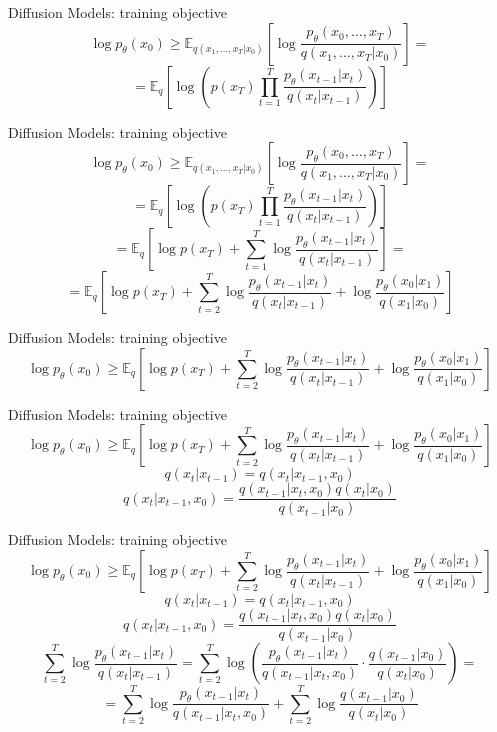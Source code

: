\documentclass{beamer}
\begin{document}
\begin{frame}[t]{Diffusion Models: training objective \cite{sohldickstein2015deep}}
    $$ \log p_\theta(x_0) \geq \mathbb{E}_{q(x_1, \dots, x_T|x_0)} \left[ \log \frac{p_\theta(x_0, \dots, x_T)}{q(x_1, \dots, x_T|x_0)} \right] = $$
    $$ = \mathbb{E}_q \left[ \log \left( p(x_T) \prod_{t=1}^T \frac{p_\theta(x_{t-1}|x_t)}{q(x_t|x_{t-1})} \right) \right] $$
\end{frame}

\begin{frame}[t]{Diffusion Models: training objective \cite{sohldickstein2015deep}}
    $$ \log p_\theta(x_0) \geq \mathbb{E}_{q(x_1, \dots, x_T|x_0)} \left[ \log \frac{p_\theta(x_0, \dots, x_T)}{q(x_1, \dots, x_T|x_0)} \right] = $$
    $$ = \mathbb{E}_q \left[ \log \left( p(x_T) \prod_{t=1}^T \frac{p_\theta(x_{t-1}|x_t)}{q(x_t|x_{t-1})} \right) \right] $$
    $$ = \mathbb{E}_q \left[ \log p(x_T) + \sum_{t=1}^T \log \frac{p_\theta(x_{t-1}|x_t)}{q(x_t|x_{t-1})} \right] = $$
    $$ = \mathbb{E}_q \left[ \log p(x_T) + \sum_{t=2}^T \log \frac{p_\theta(x_{t-1}|x_t)}{q(x_t|x_{t-1})} + \log \frac{p_\theta(x_0|x_1)}{q(x_1|x_0)} \right] $$
\end{frame}

\begin{frame}[t]{Diffusion Models: training objective \cite{sohldickstein2015deep}}
    $$ \log p_\theta(x_0) \geq \mathbb{E}_q \left[ \log p(x_T) + \sum_{t=2}^T \log \frac{p_\theta(x_{t-1}|x_t)}{q(x_t|x_{t-1})} + \log \frac{p_\theta(x_0|x_1)}{q(x_1|x_0)} \right] $$
\end{frame}

\begin{frame}[t]{Diffusion Models: training objective \cite{sohldickstein2015deep}}
    $$ \log p_\theta(x_0) \geq \mathbb{E}_q \left[ \log p(x_T) + \sum_{t=2}^T \log \frac{p_\theta(x_{t-1}|x_t)}{q(x_t|x_{t-1})} + \log \frac{p_\theta(x_0|x_1)}{q(x_1|x_0)} \right] $$
    $$ q(x_t|x_{t-1}) = q(x_t|x_{t-1}, x_0) $$
    $$ q(x_t|x_{t-1}, x_0) = \frac{q(x_{t-1}|x_t, x_0) q(x_t|x_0)}{q(x_{t-1}|x_0)} $$
\end{frame}

\begin{frame}[t]{Diffusion Models: training objective \cite{sohldickstein2015deep}}
    $$ \log p_\theta(x_0) \geq \mathbb{E}_q \left[ \log p(x_T) + \sum_{t=2}^T \log \frac{p_\theta(x_{t-1}|x_t)}{q(x_t|x_{t-1})} + \log \frac{p_\theta(x_0|x_1)}{q(x_1|x_0)} \right] $$
    $$ q(x_t|x_{t-1}) = q(x_t|x_{t-1}, x_0) $$
    $$ q(x_t|x_{t-1}, x_0) = \frac{q(x_{t-1}|x_t, x_0) q(x_t|x_0)}{q(x_{t-1}|x_0)} $$
    $$ \sum_{t=2}^T \log \frac{p_\theta(x_{t-1}|x_t)}{q(x_t|x_{t-1})} = \sum_{t=2}^T \log \left( \frac{p_\theta(x_{t-1}|x_t)}{q(x_{t-1}|x_t, x_0)} \cdot \frac{q(x_{t-1}|x_0)}{q(x_t|x_0)} \right) = $$
    $$ = \sum_{t=2}^T \log \frac{p_\theta(x_{t-1}|x_t)}{q(x_{t-1}|x_t, x_0)} + \sum_{t=2}^T \log \frac{q(x_{t-1}|x_0)}{q(x_t|x_0)} $$
\end{frame}
\end{document}
